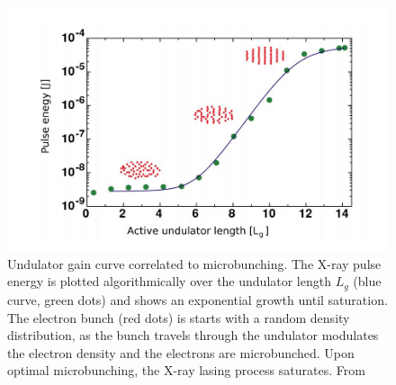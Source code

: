 \begin{figure}
	\centering
		\includegraphics[width=1.00\textwidth]{images/gain-length.JPG}
	\caption[Undulator gain curve correlated to microbunching.]{Undulator gain curve correlated to microbunching. The X-ray pulse energy is plotted algorithmically over the undulator length $L_{g}$ (blue curve, green dots) and shows an exponential growth until saturation. The electron bunch (red dots) is starts with a random density distribution, as the bunch travels through the undulator modulates the electron density and the electrons are microbunched. Upon optimal microbunching, the X-ray lasing process saturates. From \citep{Rupp-2013-Thesis,Rupp-2016-Springer}}
	\label{fig:gain-length}
\end{figure}

